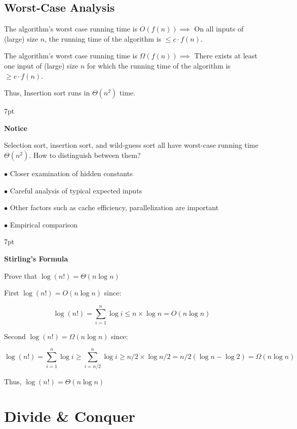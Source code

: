 \documentclass[10pt]{article}
\newenvironment{formal}[2]{%
	\def\FrameCommand{%
		\hspace{1pt}%
		{\color{#1}\vrule width 2pt}%
		{\color{#2}\vrule width 4pt}%
		\colorbox{#2}%
	}%
	\MakeFramed{\advance\hsize-\width\FrameRestore}%
	\noindent\hspace{-4.55pt}%
	\begin{adjustwidth}{}{7pt}%
		\vspace{2pt}\vspace{2pt}%
	}
	{%
		\vspace{2pt}\end{adjustwidth}\endMakeFramed%
}
\begin{document}
\subsection{Worst-Case Analysis}

The algorithm's worst case running time is $O(f(n)) \implies $ On all inputs of (large) size $n$, the running time of the algorithm is $\leq c \cdot f(n)$.

The algorithm's worst case running time is $\Omega (f(n)) \implies $ There exists at least one input of (large) size $n$ for which the running time of the algorithm is  $\geq c \cdot f(n)$.

Thus, Insertion sort runs in $\Theta (n^2)$ time.

\begin{formal}{DarkBlue}{blueshade}
	
	\textbf{Notice}
	
	Selection sort, insertion sort, and wild-guess sort all have worst-case running time $\Theta (n^2)$. How to distinguish between them?
	
	$\bullet$ Closer examination of hidden constants
	
	$\bullet$ Careful analysis of typical expected inputs
	
	$\bullet$ Other factors such as cache efficiency, parallelization are important
	
	$\bullet$ Empirical comparison
	
\end{formal}

\begin{formal}{DarkGreen}{greenshade}

	\textbf{Stirling's Formula}
	
	Prove that $\log (n!) = \Theta (n \log n)$
	
	First $\log (n!) = O (n \log n)$ since:
	
	$$
	\log (n!) = \sum_{i=1}^n \log i \leq n \times \log n = O (n \log n)
	$$

	Second $\log (n!) = \Omega (n \log n)$ since:
	
	$$
	\log (n!) = \sum_{i=1}^n \log i \geq \sum_{i=n/2}^n \log i \geq n/2 \times \log n/2 = n/2 (\log n - \log 2) = \Omega (n \log n)
	$$
	
	Thus, $\log (n!) = \Theta (n \log n)$

\end{formal}

\newpage

\section{Divide \& Conquer}
\end{document}

